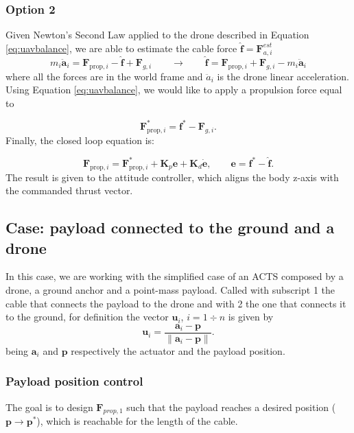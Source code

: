 \subsubsection{Option 2}
Given Newton's Second Law applied to the drone described in Equation \eqref{eq:uavbalance}, we are able to estimate the cable force $\hat{\mathbf f} = \mathbf F_{a, i}^{est}$
\begin{equation}
    m_i\ddot{\mathbf a}_i = \mathbf F_{\mathrm{prop},i} - \hat{\mathbf f} + \mathbf F_{g,i} \qquad \xrightarrow{} \qquad \hat{\mathbf f} = \mathbf F_{\mathrm{prop},i} + \mathbf F_{g,i} - m_i\ddot{\mathbf a}_i
    \label{eq:uavNewton2law}
\end{equation}
where all the forces are in the world frame and $\ddot{a}_i$ is the drone linear acceleration. Using Equation \eqref{eq:uavbalance}, we would like to apply a propulsion force equal to 

\begin{equation}
    \mathbf F_{\mathrm{prop},i}^* = \mathbf f^* - \mathbf F_{g,i}.
\end{equation}
Finally, the closed loop equation is:

\begin{equation}
    \mathbf F_{\mathrm{prop},i} = \mathbf F_{\mathrm{prop},i}^* + \mathbf K_p \mathbf e + \mathbf K_d \dot{\mathbf e}, \qquad \mathbf e = \mathbf f^*-\hat{\mathbf f}.
\end{equation}
The result is given to the attitude controller, which aligns the body z-axis with the commanded thrust vector.

\subsection{Case: payload connected to the ground and a drone}
\label{sec:payload1drone1groundCable}
In this case, we are working with the simplified case of an ACTS composed by a drone, a ground anchor and a point-mass payload. Called with subscript 1 the cable that connects the payload to the drone and with 2 the one that connects it to the ground, for definition the vector $\mathbf u_i$, $i = 1\div n$ is given by 
\begin{equation}
    \mathbf u_i = \frac{\mathbf a_i-\mathbf p} {\|\mathbf a_i-\mathbf p\|}.
\end{equation}
being $\mathbf a_i$ and $\mathbf p$ respectively the actuator and the payload position.

\subsubsection{Payload position control}
The goal is to design $\mathbf F_{prop, 1}$ such that the payload reaches a desired position ($\mathbf p \xrightarrow{} \mathbf p^*$), which is reachable for the length of the cable.


